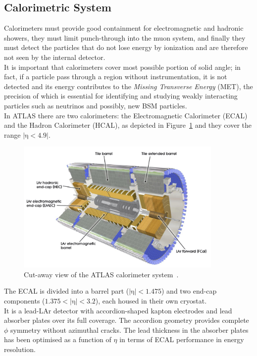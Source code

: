 \subsection{Calorimetric System}
\label{sec:CAL}
Calorimeters must provide good containment for electromagnetic and hadronic showers, they must limit punch-through into the muon system, and finally they must detect the particles that do not lose energy by ionization and are therefore not seen by the internal detector.\\
It is important that calorimeters cover most possible portion of solid angle; in fact, if a particle pass through a region without instrumentation, it is not detected and its energy contributes to the \textit{Missing 
Transverse Energy} (MET), the precision of which is essential for identifying and studying weakly interacting particles such as neutrinos and possibly, new BSM particles. \\
In ATLAS there are two calorimeters: the Electromagnetic Calorimeter (ECAL)  and the Hadron Calorimeter (HCAL), as depicted in Figure~\ref{fig:cal} and they cover the range $\mathrm{|\eta<4.9|}$.  
\begin{figure}[h]
	\centering
	\includegraphics[width=10cm]{Chapters/CH2/figures/cal}
	\caption{Cut-away view of the ATLAS calorimeter system~\cite{ATLAS}.}
	\label{fig:cal}
\end{figure}
\newpage 
\noindent The ECAL is divided into a barrel part ($\mathrm{|\eta|<1.475}$) and two end-cap components ($\mathrm{1.375<|\eta|<3.2}$), each housed in their own cryostat.\\
It is a lead-LAr detector with accordion-shaped kapton electrodes and lead absorber plates over its full coverage. The accordion geometry provides complete $\phi$ symmetry without azimuthal cracks.
The lead thickness in the absorber plates has been optimised as a function of $\eta$ in terms of ECAL performance in energy resolution. 
